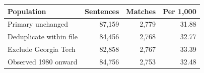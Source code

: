 \begin{tabular}{lrrr}
\toprule
Population & Sentences & Matches & Per 1,000 \\
\midrule
Primary unchanged & 87,159 & 2,779 & 31.88 \\
Deduplicate within file & 84,456 & 2,768 & 32.77 \\
Exclude Georgia Tech & 82,858 & 2,767 & 33.39 \\
Observed 1980 onward & 84,756 & 2,753 & 32.48 \\
\bottomrule
\end{tabular}
